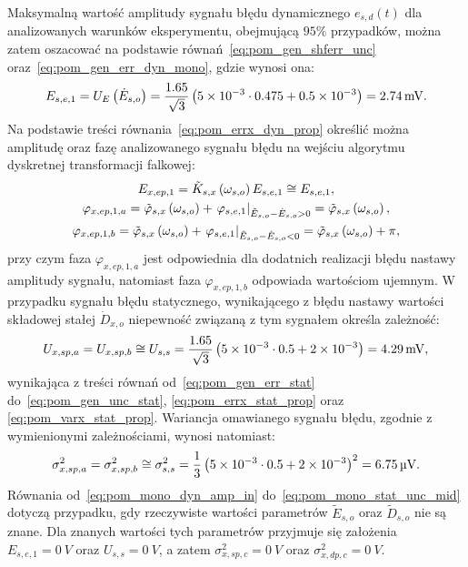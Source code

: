 Maksymalną wartość amplitudy sygnału błędu dynamicznego $e_{s,d}(t)$ dla analizowanych warunków eksperymentu, obejmującą $95\%$ przypadków, można zatem oszacować na podstawie równań~\eqref{eq:pom_gen_shferr_unc} oraz~\eqref{eq:pom_gen_err_dyn_mono}, gdzie wynosi ona:
\begin{equation}
E_{s,e,1} = U_{E} \left(\dot{E}_{s,o}\right) = \frac{1.65}{\sqrt{3}} \left(\num{5e-3} \cdot 0.475 + \num{0.5e-3}\right) = \qty{2.74}{mV} \label{eq:pom_mono_dyn_amp_in}.
\end{equation}
Na podstawie treści równania~\eqref{eq:pom_errx_dyn_prop} określić można amplitudę oraz fazę analizowanego sygnału błędu na wejściu algorytmu dyskretnej transformacji falkowej:
\begin{gather}
E_{x,ep,1} = \tilde{K}_{s,x} \left(\omega_{s,o}\right) E_{s,e,1} \cong E_{s,e,1} \label{eq:pom_mono_dyn_prop_amp_mid}, \\
\varphi_{x,ep,1,a} = \tilde{\varphi}_{s,x} \left(\omega_{s,o}\right) + \left. \varphi_{s,e,1} \right|_{\tilde{E}_{s,o} - \dot{E}_{s,o} > 0} = \tilde{\varphi}_{s,x} \left(\omega_{s,o}\right) \label{eq:pom_mono_dyn_prop_phi_mid_a}, \\
\varphi_{x,ep,1,b} = \tilde{\varphi}_{s,x} \left(\omega_{s,o}\right) + \left. \varphi_{s,e,1} \right|_{\tilde{E}_{s,o} - \dot{E}_{s,o} < 0} = \tilde{\varphi}_{s,x} \left(\omega_{s,o}\right) + \pi \label{eq:pom_mono_dyn_prop_phi_mid_b},
\end{gather}
przy czym faza $\varphi_{x,ep,1,a}$ jest odpowiednia dla dodatnich realizacji błędu nastawy amplitudy sygnału, natomiast faza $\varphi_{x,ep,1,b}$ odpowiada wartościom ujemnym. 
W przypadku sygnału błędu statycznego, wynikającego z błędu nastawy wartości składowej stałej $\dot{D}_{x,o}$ niepewność związaną z tym sygnałem określa zależność:
\begin{equation}
U_{x,sp,a} = U_{x,sp,b} \cong U_{s,s} = \frac{1.65}{\sqrt{3}} \left(\num{5e-3} \cdot 0.5 + \num{2e-3}\right) = \qty{4.29}{mV} \label{eq:pom_mono_stat_unc_mid},
\end{equation}
wynikająca z treści równań od~\eqref{eq:pom_gen_err_stat} do~\eqref{eq:pom_gen_unc_stat}, \eqref{eq:pom_errx_stat_prop} oraz \eqref{eq:pom_varx_stat_prop}. Wariancja omawianego sygnału błędu, zgodnie z wymienionymi zależnościami, wynosi natomiast:
\begin{equation}
\sigma_{x,sp,a}^{2} = \sigma_{x,sp,b}^{2} \cong \sigma_{s,s}^{2} = \frac{1}{3} \left(\num{5e-3} \cdot 0.5 + \num{2e-3}\right)^{2} = \qty{6.75}{\micro V} \label{eq:pom_mono_stat_var_mid}.
\end{equation}
Równania od~\eqref{eq:pom_mono_dyn_amp_in} do~\eqref{eq:pom_mono_stat_unc_mid} dotyczą przypadku, gdy rzeczywiste wartości parametrów $\tilde{E}_{s,o}$ oraz $\tilde{D}_{s,o}$ nie są znane. Dla znanych wartości tych parametrów przyjmuje się założenia $E_{s,e,1} = \qty{0}{V}$ oraz $U_{s,s} = \qty{0}{V}$, a zatem $\sigma_{x,sp,c}^{2} = \qty{0}{V}$ oraz $\sigma_{x,dp,c}^{2} = \qty{0}{V}$. 

